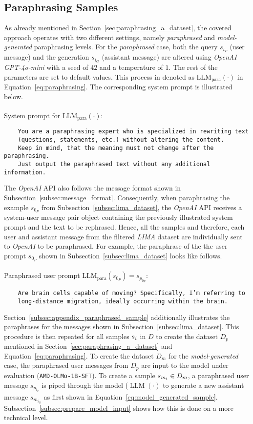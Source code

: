 \subsection{Paraphrasing Samples}\label{sec:paraphrasing_samples}
As already mentioned in Section~\ref{sec:paraphrasing_a_dataset}, the covered approach operates with two different settings, namely \emph{paraphrased} and \emph{model-generated} paraphrasing levels. For the \emph{paraphrased} case, both the query $s_{i_P}$ (user message) and the generation $s_{i_G}$ (assistant message) are altered using \emph{OpenAI GPT-4o-mini} with a seed of $42$ and a temperature of $1$. The rest of the parameters are set to default values. This process in denoted as $\operatorname{LLM_{para}}(\cdot)$ in Equation~\ref{eq:paraphrasing}. The corresponding system prompt is illustrated below.
\\\\
System prompt for $\operatorname{LLM_{para}}(\cdot)$:
\begin{verbatim}
    You are a paraphrasing expert who is specialized in rewriting text 
    (questions, statements, etc.) without altering the content. 
    Keep in mind, that the meaning must not change after the paraphrasing. 
    Just output the paraphrased text without any additional information.
\end{verbatim}
The \emph{OpenAI} API also follows the message format shown in Subsection~\ref{subsec:message_format}. Consequently, when paraphrasing the example $s_{0_P}$ from Subsection~\ref{subsec:lima_dataset}, the \emph{OpenAI} API receives a system-user message pair object containing the previously illustrated system prompt and the text to be rephrased. Hence, all the samples and therefore, each user and assistant message from the filtered \emph{LIMA} dataset are individually sent to \emph{OpenAI} to be paraphrased. For example, the paraphrase of the the user prompt $s_{0_P}$ shown in Subsection~\ref{subsec:lima_dataset} looks like follows.
\\\\
Paraphrased user prompt $\operatorname{LLM_{para}}(s_{0_P}) = s_{p_{0_P}}$:
\begin{verbatim}
    Are brain cells capable of moving? Specifically, I’m referring to
    long-distance migration, ideally occurring within the brain.
\end{verbatim}
Section~\ref{subsec:appendix_paraphrased_sample} additionally illustrates the paraphrases for the messages shown in Subsection~\ref{subsec:lima_dataset}. This procedure is then repeated for all samples $s_i$ in $D$ to create the dataset $D_p$ mentioned in Section~\ref{sec:paraphrasing_a_dataset} and Equation~\ref{eq:paraphrasing}. To create the dataset $D_m$ for the \emph{model-generated} case, the paraphrased user messages from $D_p$ are input to the model under evaluation (\texttt{AMD-OLMo-1B-SFT}). To create a sample $s_{m_i} \in D_m$, a paraphrased user message $s_{p_{i_P}}$ is piped through the model ($\operatorname{LLM}(\cdot)$ to generate a new assistant message $s_{m_{i_G}}$ as first shown in Equation~\ref{eq:model_generated_sample}. Subsection~\ref{subsec:prepare_model_input} shows how this is done on a more technical level.

